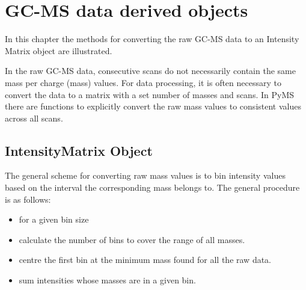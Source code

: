 

\chapter{GC-MS data derived objects}

In this chapter the methods for converting the raw GC-MS data to an
Intensity Matrix object are illustrated.

In the raw GC-MS data, consecutive scans do not necessarily contain the same
mass per charge (mass) values. For data processing, it is often necessary to
convert the data to a matrix with a set number of masses and scans. In PyMS
there are functions to explicitly convert the raw mass values to consistent
values across all scans.

\section{IntensityMatrix Object}

The general scheme for converting raw mass values is to bin intensity values
based on the interval the corresponding mass belongs to. The general procedure
is as follows:
\begin{itemize}
    \item for a given bin size
    \item calculate the number of bins to cover the range of all masses.
    \item centre the first bin at the minimum mass found for all the raw data.
    \item sum intensities whose masses are in a given bin.
\end{itemize}

